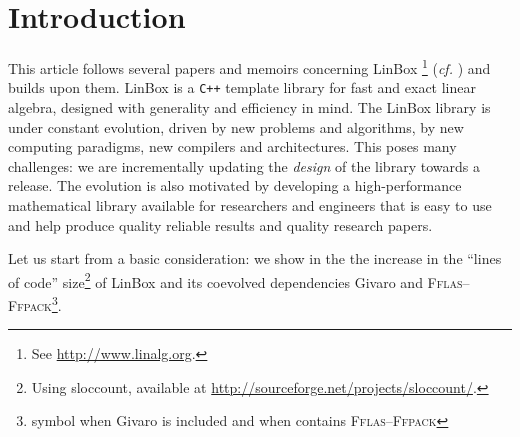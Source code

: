 \documentclass[a4paper]{article}
\def\textsf#1{{\biolinum #1}}
\def\scsf#1{{\scshape \biolinum #1}} %
\newcommand\linbox{\textsf{LinBox}\xspace}
\newcommand\cpp{\texttt{C++}\xspace}
\newcommand\fflasffpack{\scsf{Fflas--Ffpack}\xspace}
\newcommand\givaro{\textsf{Givaro}\xspace}
\newcommand{\cf}{\mbox{\emph{cf.}}\xspace}
\newcommand\td{\textsuperscript{\textdagger}}
\newcommand\tdd{\textsuperscript{\textdaggerdbl}}
\begin{document}
\section{Introduction}
%
This article follows several papers and memoirs concerning \linbox%
%
\footnote{See \url{http://www.linalg.org}.}
%
(\cf{} \cite{Giorgi:2004:these,Turner:2002:these,Boyer:2012:these,Dumas:2002:icms,Dumas:2010:lbpar})
and builds upon them.
%
\linbox is a \cpp template library for fast and exact linear algebra, designed with generality
and efficiency in mind.
%
%
The \linbox library is under constant evolution, driven by new problems and
algorithms, by new computing paradigms, new compilers and architectures. This
poses many challenges: we are incrementally
updating the \emph{design} of the library towards a \textsf{2.0} release.
The evolution is also motivated by developing a high-performance mathematical
library available for researchers and engineers that is easy to use and help
produce quality reliable results and quality research papers.
%
\par
%
Let us start from a basic consideration: we show in the  the
increase in the ``lines of code'' size\footnote{Using \textsf{sloccount}, available at
\url{http://sourceforge.net/projects/sloccount/}.}
%
of \linbox and its coevolved dependencies \givaro and
\fflasffpack\footnote{symbol \td when \givaro is included and \tdd when
contains \fflasffpack}.
%
%
% 
\end{document}
